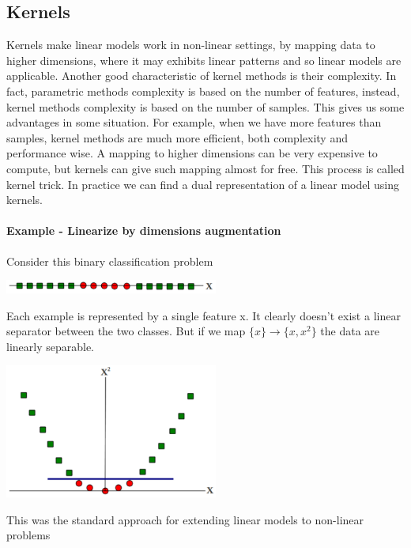 \documentclass[../main.tex]{subfiles}
\begin{document}
\subsection{Kernels}
Kernels make linear models work in non-linear settings, by mapping data to higher dimensions, where it may exhibits linear patterns and so linear models are applicable. Another good characteristic of kernel methods is their complexity. In fact, parametric methods complexity is based on the number of features, instead, kernel methods complexity is based on the number of samples. This gives us some advantages in some situation. For example, when we have more features than samples, kernel methods are much more efficient, both complexity and performance wise.
A mapping to higher dimensions can be very expensive to compute, but kernels can give such mapping almost for free. This process is called kernel trick. In practice we can find a dual representation of a linear model using kernels.
\paragraph{Example - Linearize by dimensions augmentation} Consider this binary classification problem

\begin{center}
    \includegraphics[width=70mm]{images/Add_Dimension.PNG}
\end{center}

Each example is represented by a single feature x. It clearly doesn't exist a linear separator between the two classes. But if we map $\{x\} \rightarrow \{x,x^2\}$ the data are linearly separable.

\begin{center}
    \includegraphics[width=70mm]{images/Add_Dimension2.PNG}
\end{center}
This was the standard approach for extending linear models to non-linear problems
\end{document}
